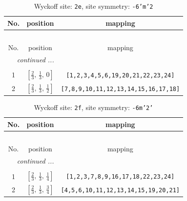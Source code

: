 \documentclass[fleqn,8pt]{jsarticle}
\begin{document}
\begin{longtable}{ccc}
\caption{Wyckoff site: {\tt 2e}, site symmetry: {\tt -6'm'2}}
 \\
 \hline \hline
No. & position & mapping \\ \hline \endfirsthead

\multicolumn{2}{l}{\tablename\ \thetable{}} \\
 \hline \hline
No. & position & mapping \\ \hline \endhead

 \hline \hline
\multicolumn{2}{r}{\footnotesize\it continued ...} \\ \endfoot

 \hline \hline
\multicolumn{2}{r}{} \\ \endlastfoot

1 & $\left[ \frac{2}{3},\, \frac{1}{3},\, 0 \right]$ & {\tt [1,2,3,4,5,6,19,20,21,22,23,24]} \\ \hline
2 & $\left[ \frac{2}{3},\, \frac{1}{3},\, \frac{1}{2} \right]$ & {\tt [7,8,9,10,11,12,13,14,15,16,17,18]} \\
\end{longtable}
\renewcommand{\arraystretch}{1.2}
\begin{longtable}{ccc}
\caption{Wyckoff site: {\tt 2f}, site symmetry: {\tt -6m'2'}}
 \\
 \hline \hline
No. & position & mapping \\ \hline \endfirsthead

\multicolumn{2}{l}{\tablename\ \thetable{}} \\
 \hline \hline
No. & position & mapping \\ \hline \endhead

 \hline \hline
\multicolumn{2}{r}{\footnotesize\it continued ...} \\ \endfoot

 \hline \hline
\multicolumn{2}{r}{} \\ \endlastfoot

1 & $\left[ \frac{2}{3},\, \frac{1}{3},\, \frac{1}{4} \right]$ & {\tt [1,2,3,7,8,9,16,17,18,22,23,24]} \\ \hline
2 & $\left[ \frac{2}{3},\, \frac{1}{3},\, \frac{3}{4} \right]$ & {\tt [4,5,6,10,11,12,13,14,15,19,20,21]} \\
\end{longtable}
\renewcommand{\arraystretch}{1.2}
\end{document}
